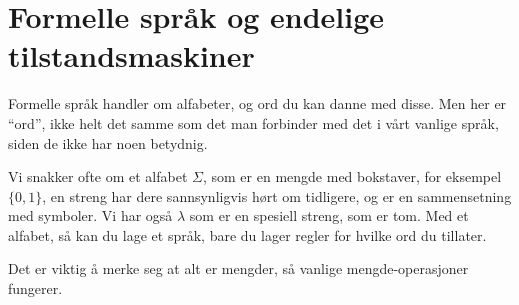 \section{Formelle språk og endelige tilstandsmaskiner}

Formelle språk handler om alfabeter, og ord du kan danne med disse. Men her er \enquote{ord},
ikke helt det samme som det man forbinder med det i vårt vanlige språk, siden de ikke har noen betydnig.

Vi snakker ofte om et alfabet $\Sigma$, som er en mengde med bokstaver, for eksempel $\{0,1\}$, en streng
har dere sannsynligvis hørt om tidligere, og er en sammensetning med symboler. Vi har også $\lambda$ som er
en spesiell streng, som er tom. Med et alfabet, så kan du lage et språk, bare du lager regler for
hvilke ord du tillater.

Det er viktig å merke seg at alt er mengder, så vanlige mengde-operasjoner fungerer.
